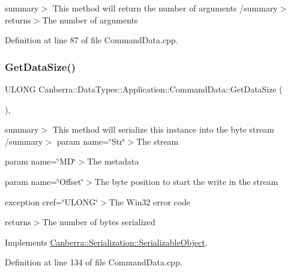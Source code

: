 summary$>$ This method will return the number of arguments /summary$>$ returns$>$The number of arguments

Definition at line 87 of file Command\+Data.\+cpp.

\mbox{\label{class_canberra_1_1_data_types_1_1_application_1_1_command_data_a5f9db7c557a2554454494968d55ac00f_a5f9db7c557a2554454494968d55ac00f}} 
\subsubsection{\texorpdfstring{Get\+Data\+Size()}{GetDataSize()}}
{\footnotesize\ttfamily U\+L\+O\+NG Canberra\+::\+Data\+Types\+::\+Application\+::\+Command\+Data\+::\+Get\+Data\+Size (\begin{DoxyParamCaption}{ }\end{DoxyParamCaption})\hspace{0.3cm}{\ttfamily [protected]}, {\ttfamily [virtual]}}

summary$>$ This method will serialize this instance into the byte stream /summary$>$ param name=\char`\"{}\+Str\char`\"{}$>$The stream

param name=\char`\"{}\+M\+D\char`\"{}$>$The metadata

param name=\char`\"{}\+Offset\char`\"{}$>$The byte position to start the write in the stream

exception cref=\char`\"{}\+U\+L\+O\+N\+G\char`\"{}$>$The Win32 error code

returns$>$The number of bytes serialized

Implements \hyperlink{class_canberra_1_1_serialization_1_1_serializable_object}{Canberra\+::\+Serialization\+::\+Serializable\+Object}.



Definition at line 134 of file Command\+Data.\+cpp.

\mbox{\label{class_canberra_1_1_data_types_1_1_application_1_1_command_data_ae3bf97c25298153e47ff6518e75b83bd_ae3bf97c25298153e47ff6518e75b83bd}} 
